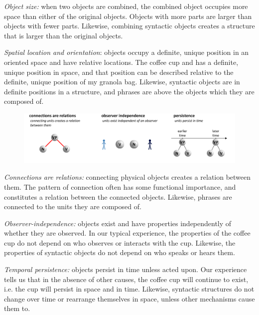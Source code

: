 \textit{Object size:} when two objects are combined, the combined object occupies more space than either of the original objects. Objects with more parts are larger than objects with fewer parts. Likewise, combining syntactic objects creates a structure that is larger than the original objects.

\textit{Spatial location and orientation}: objects occupy a definite, unique position in an oriented space and have relative locations. The coffee cup and has a definite, unique position in space, and that position can be described relative to the definite, unique position of my granola bag. Likewise, syntactic objects are in definite positions in a structure, and phrases are above the objects which they are composed of.

  
\begin{figure}
\includegraphics[width=\textwidth]{figures/Tilsen-img31.png}
\caption{\missingcaption}
\label{fig:3:3}
\end{figure}
 

\textit{Connections are relations:} connecting physical objects creates a relation between them. The pattern of connection often has some functional importance, and constitutes a relation between the connected objects. Likewise, phrases are connected to the units they are composed of.

\textit{Observer-independence:} objects exist and have properties independently of whether they are observed. In our typical experience, the properties of the coffee cup do not depend on who observes or interacts with the cup. Likewise, the properties of syntactic objects do not depend on who speaks or hears them.

\textit{Temporal persistence:} objects persist in time unless acted upon. Our experience tells us that in the absence of other causes, the coffee cup will continue to exist, i.e. the cup will persist in space and in time. Likewise, syntactic structures do not change over time or rearrange themselves in space, unless other mechanisms cause them to.

